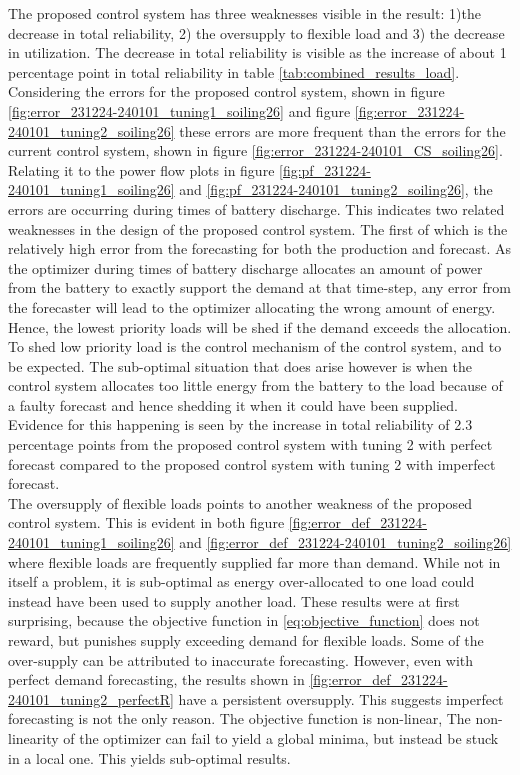 The proposed control system has three weaknesses visible in the result: 1)the decrease in total reliability, 2) the oversupply to flexible load and 3) the decrease in utilization. The decrease in total reliability is visible as the increase of about 1 percentage point in total reliability in table \ref{tab:combined_results_load}. Considering the errors for the proposed control system, shown in figure \ref{fig:error_231224-240101_tuning1_soiling26} and figure \ref{fig:error_231224-240101_tuning2_soiling26} these errors are more frequent than the errors for the current control system, shown in figure \ref{fig:error_231224-240101_CS_soiling26}. Relating it to the power flow plots in figure \ref{fig:pf_231224-240101_tuning1_soiling26} and \ref{fig:pf_231224-240101_tuning2_soiling26}, the errors are occurring during times of battery discharge. This indicates two related weaknesses in the design of the proposed control system. The first of which is the relatively high error from the forecasting for both the production and forecast. As the optimizer during times of battery discharge allocates an amount of power from the battery to exactly support the demand at that time-step, any error from the forecaster will lead to the optimizer allocating the wrong amount of energy. Hence, the lowest priority loads will be shed if the demand exceeds the allocation. To shed low priority load is the control mechanism of the control system, and to be expected. The sub-optimal situation that does arise however is when the control system allocates too little energy from the battery to the load because of a faulty forecast and hence shedding it when it could have been supplied. Evidence for this happening is seen by the increase in total reliability of 2.3 percentage points from the proposed control system with tuning 2 with perfect forecast compared to the proposed control system with tuning 2 with imperfect forecast.\\

The oversupply of flexible loads points to another weakness of the proposed control system. This is evident in both figure \ref{fig:error_def_231224-240101_tuning1_soiling26} and \ref{fig:error_def_231224-240101_tuning2_soiling26} where flexible loads are frequently supplied far more than demand. While not in itself a problem, it is sub-optimal as energy over-allocated to one load could instead have been used to supply another load. These results were at first surprising, because the objective function in \ref{eq:objective_function} does not reward, but punishes supply exceeding demand for flexible loads. Some of the over-supply can be attributed to inaccurate forecasting. However, even with perfect demand forecasting, the results shown in \ref{fig:error_def_231224-240101_tuning2_perfectR} have a persistent oversupply. This suggests imperfect forecasting is not the only reason. The objective function is non-linear,  The non-linearity of the optimizer can fail to yield a global minima, but instead be stuck in a local one. This yields sub-optimal results.

